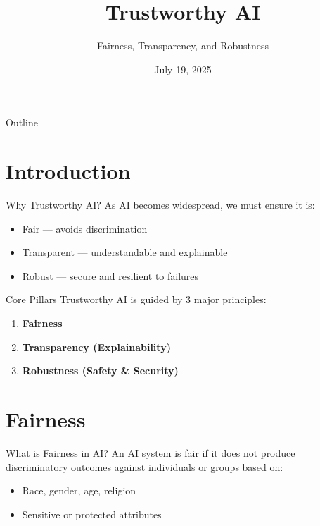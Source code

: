 \documentclass{beamer}
\title{Trustworthy AI}
\subtitle{Fairness, Transparency, and Robustness}
\date{July 19, 2025}
\begin{document}
{
\begin{frame}
    \titlepage
\end{frame}
}

\begin{frame}{Outline}
    \tableofcontents
\end{frame}

\section{Introduction}
\begin{frame}{Why Trustworthy AI?}
As AI becomes widespread, we must ensure it is:
\begin{itemize}
    \item Fair — avoids discrimination
    \item Transparent — understandable and explainable
    \item Robust — secure and resilient to failures
\end{itemize}
\end{frame}

\begin{frame}{Core Pillars}
Trustworthy AI is guided by 3 major principles:
\begin{enumerate}
    \item \textbf{Fairness}
    \item \textbf{Transparency (Explainability)}
    \item \textbf{Robustness (Safety \& Security)}
\end{enumerate}
\end{frame}

\section{Fairness}
\begin{frame}{What is Fairness in AI?}
An AI system is fair if it does not produce discriminatory outcomes against individuals or groups based on:
\begin{itemize}
    \item Race, gender, age, religion
    \item Sensitive or protected attributes
\end{itemize}
\end{frame}
\end{document}
